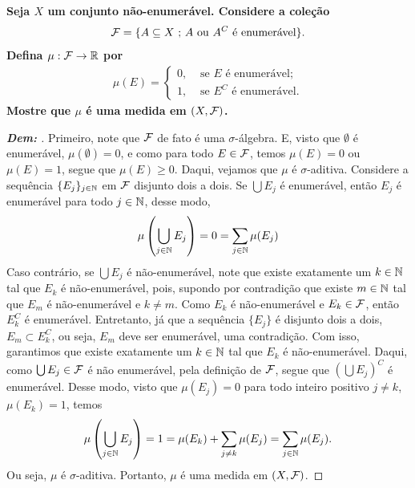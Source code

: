 \biglinend
\newpage 
{}
\myexe{\thedois}
\bigline
\textbf{Seja $X$ um conjunto não-enumerável. Considere a coleção 
$$\mathcal F = \{A \subseteq X\text{ ; }  A \text{ ou } A^C \text{ é enumerável}\}.$$ Defina $\mu: \mathcal F\rightarrow \mathbb R$
por 
\begin{align*}
  \mu(E) = \begin{cases}
    0, &\text{ se $E$ é enumerável;}\\
    1, &\text{ se $E^C$ é enumerável.}
  \end{cases}
\end{align*}
Mostre que $\mu$ é uma medida em $(X, \mathcal F)$.
}
\begin{proof}[\textbf{Dem: }]
  Primeiro, note que $\mathcal F$ de fato é uma $\sigma$-álgebra. E, visto 
  que $\emptyset$ é enumerável, $\mu(\emptyset) = 0$, e como para todo $E \in \mathcal F$, temos $\mu(E) = 0$ 
  ou $\mu(E) = 1$, segue que $\mu(E) \ge 0$. Daqui, vejamos que $\mu$ é $\sigma$-aditiva. 
  Considere a sequência $\{E_j\}_{j \in \mathbb N}$ em $\mathcal F$ disjunto dois a dois. Se $\bigcup E_j$ é enumerável, 
  então $E_j$ é enumerável para todo $j \in \mathbb N$, desse modo, 
  \begin{align*}
    \mu\left(\bigcup\limits_{j \in \mathbb N} E_j\right) = 0 = \sum_{j \in \mathbb N} \mu(E_j)
  \end{align*}
  Caso contrário, se $\bigcup E_j$ é não-enumerável, note que existe exatamente um $k \in \mathbb N$ tal que $E_k$ é 
  não-enumerável, pois, supondo por contradição que existe $m \in \mathbb N$ tal que $E_m$ é não-enumerável e $k \neq m$. 
  Como $E_k$ é não-enumerável e $E_k \in \mathcal F$, então $E_k^C$ é enumerável. Entretanto, já que a sequência $\{E_j\}$
  é disjunto dois a dois, $E_m \subset E_k^C$, ou seja, $E_m$ deve ser enumerável, uma contradição. Com isso, garantimos 
  que existe exatamente um $k \in \mathbb N$ tal que $E_k$ é não-enumerável. Daqui, como $\bigcup E_j \in \mathcal F$ é não enumerável,
  pela definição de $\mathcal F$, segue que 
  $\left(\bigcup E_j\right)^C$ é enumerável. Desse modo, visto que $\mu(E_j) = 0$ para todo 
  inteiro positivo $j \neq k$, $\mu(E_k) = 1$, temos
  \begin{align*}
    \mu\left(\bigcup\limits_{j \in \mathbb N} E_j\right) = 1 = \mu(E_k) + \sum_{j \neq k} \mu(E_j) 
    = \sum_{j \in \mathbb N} \mu(E_j).
  \end{align*}
  Ou seja, $\mu$ é $\sigma$-aditiva. Portanto, $\mu$ é uma medida em $(X, \mathcal F)$.
\end{proof}


